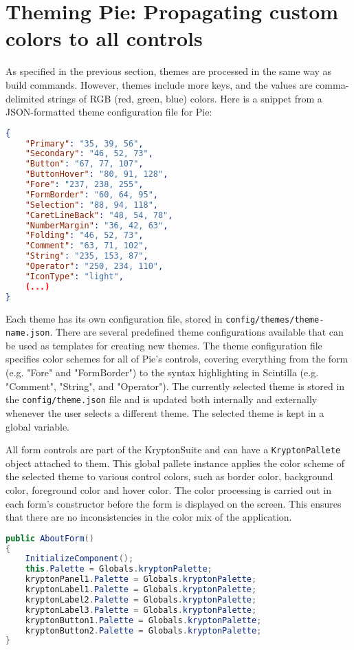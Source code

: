 \section{Theming Pie: Propagating custom colors to all controls}

As specified in the previous section, themes are processed in the same way as build commands. However, themes include more keys, and the values are comma-delimited strings of RGB (red, green, blue) colors. Here is a snippet from a JSON-formatted theme configuration file for Pie:

\begin{lstlisting}[language=json, caption={Theme configuration example in Pie}]
{
	"Primary": "35, 39, 56",
	"Secondary": "46, 52, 73",
	"Button": "67, 77, 107",
	"ButtonHover": "80, 91, 128",
	"Fore": "237, 238, 255",
	"FormBorder": "60, 64, 95",
	"Selection": "88, 94, 118",
	"CaretLineBack": "48, 54, 78",
	"NumberMargin": "36, 42, 63",
	"Folding": "46, 52, 73",
	"Comment": "63, 71, 102",
    "String": "235, 153, 87",
	"Operator": "250, 234, 110",
    "IconType": "light",
    (...)
}
\end{lstlisting}

Each theme has its own configuration file, stored in \texttt{config/themes/theme-name.json}. There are several predefined theme configurations available that can be used as templates for creating new themes. The theme configuration file specifies color schemes for all of Pie's controls, covering everything from the form (e.g. "Fore" and "FormBorder") to the syntax highlighting in Scintilla (e.g. "Comment", "String", and "Operator"). The currently selected theme is stored in the \texttt{config/theme.json} file and is updated both internally and externally whenever the user selects a different theme. The selected theme is kept in a global variable.

All form controls are part of the KryptonSuite and can have a \texttt{KryptonPallete} object attached to them. This global pallete instance applies the color scheme of the selected theme to various control colors, such as border color, background color, foreground color and hover color. The color processing is carried out in each form's constructor before the form is displayed on the screen. This ensures that there are no inconsistencies in the color mix of the application.

\begin{lstlisting}[language=csharp, caption={AboutForm's constructor, setting the global kryptonPalette object to each control visible in the form}]
public AboutForm()
{
    InitializeComponent();
    this.Palette = Globals.kryptonPalette;
    kryptonPanel1.Palette = Globals.kryptonPalette;
    kryptonLabel1.Palette = Globals.kryptonPalette;
    kryptonLabel2.Palette = Globals.kryptonPalette;
    kryptonLabel3.Palette = Globals.kryptonPalette;
    kryptonButton1.Palette = Globals.kryptonPalette;
    kryptonButton2.Palette = Globals.kryptonPalette;
}
\end{lstlisting}

